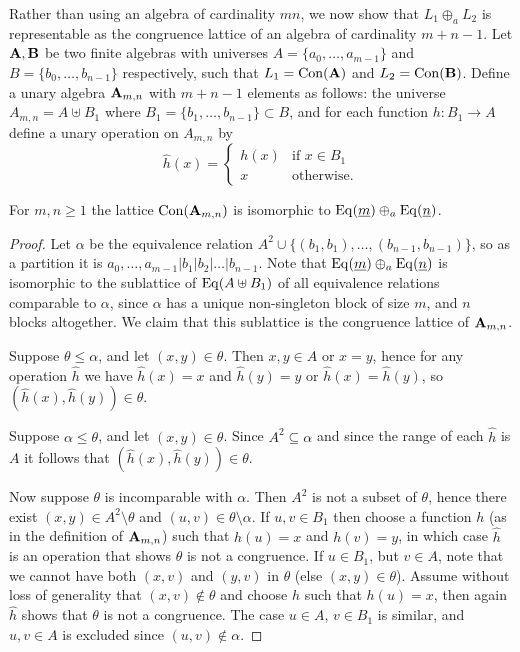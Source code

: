 Rather than using an algebra of cardinality $mn$,
we now show that $L_1\oplus_aL_2$ is representable as the congruence 
lattice of an algebra of cardinality $m+n-1$.
Let $\mathbf{A},\mathbf{B}$ be two finite algebras with universes $A=\{a_0,\dots,a_{m-1}\}$ and 
$B=\{b_0,\dots,b_{n-1}\}$ respectively,
such that $L_1=\operatorname{Con}(\mathbf{A})$ and $L_2=\operatorname{Con}(\mathbf{B})$. 
Define a unary algebra $\mathbf{A}_{m,n}$ with $m+n-1$ elements as follows: 
the universe $A_{m,n}=A\uplus B_1$ where
$B_1=\{b_1,\dots,b_{n-1}\}\subset B$, and for each function $h:B_1\to A$ 
define a unary operation on $A_{m,n}$ by
$$\hat h(x)=\begin{cases}h(x)&\text{if $x\in B_1$}\\ 
x&\text{otherwise.}\end{cases}$$

\begin{lemma}
  For $m,n\ge 1$ the lattice $\operatorname{Con}(\mathbf{A}_{m,n})$ is isomorphic to
  $\operatorname{Eq}(\underline{m})\oplus_a \operatorname{Eq}(\underline{n})$. 
\end{lemma}
\begin{proof}
  Let $\alpha$ be the equivalence relation
  $A^2\cup\{(b_1,b_1),\dots,(b_{n-1},b_{n-1})\}$, so as a partition it is  
  $a_0,\dots,a_{m-1}|b_1|b_2|\dots|b_{n-1}$. 
  Note that $\operatorname{Eq}(\underline{m})\oplus_a \operatorname{Eq}(\underline{n})$ is isomorphic to the sublattice
  of $\operatorname{Eq}(A\uplus B_1)$ of all equivalence relations comparable to $\alpha$, since
  $\alpha$ has a unique non-singleton block of size $m$, and $n$ blocks
  altogether. We claim that this sublattice is the congruence lattice of $\mathbf{A}_{m,n}$.  

  Suppose $\theta\le\alpha$, and let $(x,y)\in\theta$. Then $x,y\in A$ or $x=y$,
  hence for any operation $\hat h$ we  have $\hat h(x)=x$ and $\hat h(y)=y$ or
  $\hat h(x)=\hat h(y)$, so $(\hat h(x),\hat h(y))\in\theta$. 

  Suppose $\alpha\le\theta$, and let $(x,y)\in\theta$. Since $A^2\subseteq\alpha$
  and since the range of each $\hat h$ is $A$ it follows that 
  $(\hat h(x),\hat h(y))\in\theta$. 

  Now suppose $\theta$ is incomparable with $\alpha$. Then $A^2$ is not a subset
  of $\theta$, hence there exist $(x,y)\in A^2\setminus\theta$ and
  $(u,v)\in\theta\setminus\alpha$. If $u,v\in B_1$ then choose a function $h$ (as
  in the definition of $\mathbf{A}_{m,n}$) such that $h(u)=x$ and $h(v)=y$, in which
  case $\hat h$ is an operation that shows $\theta$ is not a congruence. 
  If $u\in B_1$, but $v\in A$, note that we cannot have both $(x,v)$ and $(y,v)$
  in $\theta$ (else $(x,y)\in\theta$). Assume without loss of generality 
  that $(x,v)\notin\theta$ and choose $h$ such that $h(u)=x$, then again $\hat h$
  shows that $\theta$ is not a congruence. 
  The case $u\in A$, $v\in B_1$ is similar, and $u,v\in A$ is excluded since
  $(u,v)\notin\alpha$. 
\end{proof}

